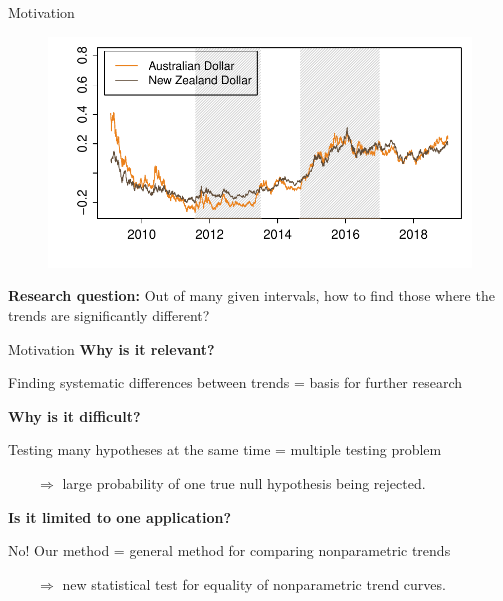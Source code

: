 \documentclass[10pt, handout]{beamer}
\begin{document}
\begin{frame}{Motivation}
{\begin{figure}
  	\end{figure}}	
	{\onslide<4->
	\vspace{-46,81mm}
	\begin{figure}
    		\centering
    		\includegraphics[height=0.45\textheight]{plots/exchange_rates_2.pdf}
  	\end{figure}}	
\vspace{-3mm}
{\textbf{Research question:}
	Out of many given intervals, how to find those where the trends are significantly different?}


\end{frame}

\begin{frame}{Motivation}
\vspace{-4mm}
\textbf{Why is it relevant?}

Finding systematic differences between trends = basis for further research


\vspace{3mm}

\textbf{Why is it difficult?}	

Testing many hypotheses at the same time = multiple testing problem

$\quad \quad \Rightarrow$ large probability of one true null hypothesis being rejected.\pause

\vspace{3mm}

\textbf{Is it limited to one application?}

No! Our method = general method for comparing nonparametric trends

$\quad \quad \Rightarrow$ new statistical test for equality of nonparametric trend curves.
 
\end{frame}
\end{document}
